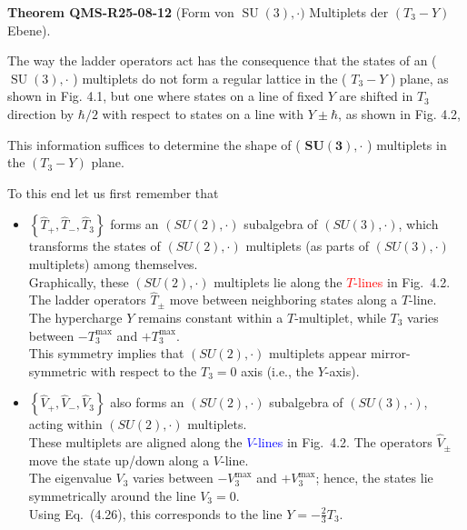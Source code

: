 \documentclass[10pt, letterpaper]{article}
\newcommand{\CustomHeading}[3]{%
  \par\medskip\noindent%
  \textbf{#1 #2} \textnormal{(#3)}.\enskip%
}
\newenvironment{THEO}[2]{\begin{unitbox}\CustomHeading{Theorem}{#1}{#2}}{\end{unitbox}}
\begin{document}
\begin{THEO}{QMS-R25-08-12}{Form von $\operatorname{SU}(3),\cdot)$ Multiplets der $\left(T_{3}-Y\right)$ Ebene}
The way the ladder operators act has the consequence that the states of an ( $\operatorname{SU}(3), \cdot$ ) multiplets do not form a regular lattice in the ( $T_{3}-Y$ ) plane, as shown in Fig. 4.1, but one where states on a line of fixed $Y$ are shifted in $T_{3}$ direction by $\hbar / 2$ with respect to states on a line with $Y \pm \hbar$, as shown in Fig. 4.2,

This information suffices to determine the shape of ( $\boldsymbol{S} \boldsymbol{U}(\mathbf{3}), \cdot$ ) multiplets in the $\left(T_{3}-Y\right)$ plane. 


To this end let us first remember that
\begin{itemize}
  \item[(i)] $\left\{\hat{T}_{+}, \hat{T}_{-}, \hat{T}_{3}\right\}$ forms an $(SU(2),\cdot)$ subalgebra of $(SU(3),\cdot)$, which transforms the states of $(SU(2),\cdot)$ multiplets (as parts of $(SU(3),\cdot)$ multiplets) among themselves.\\
  Graphically, these $(SU(2),\cdot)$ multiplets lie along the \textcolor{red}{$T$-lines} in Fig.~4.2. The ladder operators $\hat{T}_{\pm}$ move between neighboring states along a $T$-line.\\
  The hypercharge $Y$ remains constant within a $T$-multiplet, while $T_3$ varies between $-T_3^{\max}$ and $+T_3^{\max}$.\\
  This symmetry implies that $(SU(2),\cdot)$ multiplets appear mirror-symmetric with respect to the $T_3 = 0$ axis (i.e., the $Y$-axis).

  \item[(ii)] $\left\{\hat{V}_{+}, \hat{V}_{-}, \hat{V}_{3}\right\}$ also forms an $(SU(2),\cdot)$ subalgebra of $(SU(3),\cdot)$, acting within $(SU(2),\cdot)$ multiplets.\\
  These multiplets are aligned along the \textcolor{blue}{$V$-lines} in Fig.~4.2. The operators $\hat{V}_{\pm}$ move the state up/down along a $V$-line.\\
  The eigenvalue $V_3$ varies between $-V_3^{\max}$ and $+V_3^{\max}$; hence, the states lie symmetrically around the line $V_3 = 0$.\\
  Using Eq.~(4.26), this corresponds to the line $Y = -\frac{2}{3} T_3$.


\end{itemize}
\end{THEO}
\end{document}
